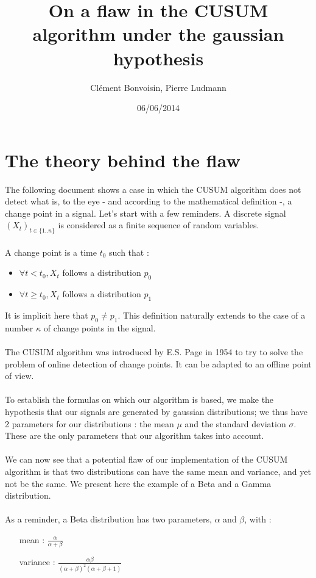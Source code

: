 \documentclass[french]{article}
\title{On a flaw in the CUSUM algorithm under the gaussian hypothesis}
\author{Clément Bonvoisin, Pierre Ludmann}
\date{06/06/2014}
\begin{document}
\maketitle

\section{The theory behind the flaw}
The following document shows a case in which the CUSUM algorithm does not detect what is, to the eye - and according to the mathematical definition -, a change point in a signal.
\linebreak
\linebreak
Let's start with a few reminders. A discrete signal $(X_t)_{t \in \{1..n\}}$ is considered as a finite sequence of random variables.
\\ \\
A change point is a time $t_0$ such that :
\begin{itemize}
	\item $\forall t < t_0, X_t$ follows a distribution $p_0$
	\item $\forall t \geq t_0, X_t$ follows a distribution $p_1$
\end{itemize}
It is implicit here that $p_0 \ne p_1$. This definition naturally extends to the case of a number $\kappa$ of change points in the signal.
\\ \\
The CUSUM algorithm was introduced by E.S. Page in 1954 to try to solve the problem of online detection of change points. It can be adapted to an offline point of view.
\\ \\
To establish the formulas on which our algorithm is based, we make the hypothesis that our signals are generated by gaussian distributions; we thus have 2 parameters for our distributions : the mean $\mu$ and the standard deviation $\sigma$. These are the only parameters that our algorithm takes into account.
\\ \\
We can now see that a potential flaw of our implementation of the CUSUM algorithm is that two distributions can have the same mean and variance, and yet not be the same. We present here the example of a Beta and a Gamma distribution.
\\ \\
As a reminder, a Beta distribution has two parameters, $\alpha$ and $\beta$, with :
\begin{itemize}
	\item[mean] : $\frac{\alpha}{\alpha + \beta}$
	\item[variance] : $\frac{\alpha \beta}{(\alpha + \beta)^2(\alpha + \beta + 1)}$
\end{itemize}
\end{document}
